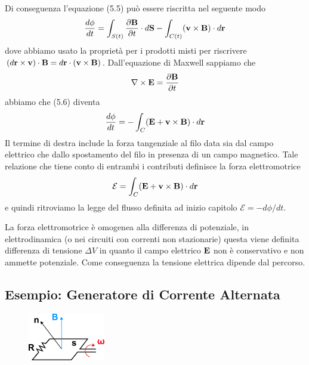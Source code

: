 Di conseguenza l'equazione (5.5) pu\`o essere riscritta nel seguente modo
\begin{equation}
	\frac{d\phi }{dt } = \int_{S(t)}\frac{\partial \bold{B}}{\partial t} \cdot d\bold{S} - \int_{C(t)}(\bold{v} \times \bold{B})\cdot d\bold{r}
\end{equation}
dove abbiamo usato la propriet\`a per i prodotti misti per riscrivere $(d\bold{r} \times \bold{v} ) \cdot \bold{B} = d\bold{r} \cdot (\bold{v} \times \bold{B})$. Dall'equazione di Maxwell sappiamo che 
\begin{equation*}
	\nabla \times \bold{E} = \frac{\partial \bold{B}}{\partial t} 
\end{equation*}
abbiamo che (5.6) diventa 
\begin{equation*}
	\frac{d\phi}{dt} = - \int_{C} (\bold{E}+\bold{v} \times \bold{B}) \cdot d\bold{r} 
\end{equation*}
Il termine di destra include la forza tangenziale al filo data sia dal campo elettrico che dallo spostamento del filo in presenza di un campo magnetico. Tale relazione che tiene conto di entrambi i contributi definisce la forza elettromotrice 
\begin{equation}
	\mathcal{E} = \int_{C}(\bold{E} + \bold{v} \times \bold{B}) \cdot d \bold{r}
\end{equation}
e quindi ritroviamo la legge del flusso definita ad inizio capitolo $\mathcal{E} = - d\phi /dt$.

La forza elettromotrice \`e omogenea alla differenza di potenziale, in elettrodinamica (o nei circuiti con correnti non stazionarie) questa viene definita differenza di tensione $\Delta V$ in quanto il campo elettrico $\bold{E}$ non \`e conservativo e non ammette potenziale. Come conseguenza la tensione elettrica dipende dal percorso.
\newpage

\subsection{Esempio: Generatore di Corrente Alternata }

\begin{figure} %
    \centering
    \includegraphics[width=0.30\textwidth]{images/alt_gen.png} %
\end{figure}

